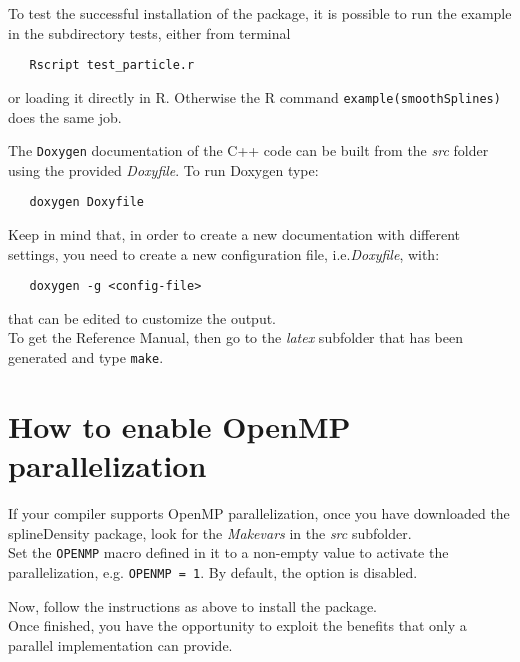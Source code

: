 To test the successful installation of the package, it is possible to run the example in the subdirectory tests, either from terminal
\begin{verbatim}
   Rscript test_particle.r
\end{verbatim}
or loading it directly in R. Otherwise the R command \verb|example(smoothSplines)| does the same job.

The \verb|Doxygen| documentation of the C++ code can be built from the \textit{src} folder using the provided \textit{Doxyfile}. To run Doxygen type:
\begin{verbatim}
   doxygen Doxyfile
\end{verbatim}
Keep in mind that, in order to create a new documentation with different settings, you need to create a new configuration file, i.e.\textit{Doxyfile}, with:
\begin{verbatim}
   doxygen -g <config-file>
\end{verbatim}
that can be edited to customize the output. \\

To get the Reference Manual, then go to the \textit{latex} subfolder that has been generated and type \verb|make|.




\section{How to enable OpenMP parallelization}
If your compiler supports OpenMP parallelization, once you have downloaded the splineDensity package, look for the \textit{Makevars} in the \textit{src} subfolder.\\
Set the \verb|OPENMP| macro defined in it to a non-empty value to activate the parallelization, e.g. \verb|OPENMP = 1|. By default, the option is disabled.

Now, follow the instructions as above to install the package. \\
Once finished, you have the opportunity to exploit the benefits that only a parallel implementation can provide.
